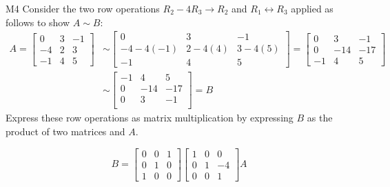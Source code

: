 \begin{problem}{M4}
Consider the two row operations 
\(R_2-4R_3\to R_2\) and \(R_1\leftrightarrow R_3\)
applied as follows to show \(A\sim B\):
\begin{align*}
A
  =
\begin{bmatrix}
0&3&-1\\
-4&2&3\\
-1&4&5
\end{bmatrix}
  &\sim
\begin{bmatrix}
0&3&-1\\
-4-4(-1)&2-4(4)&3-4(5)\\
-1&4&5
\end{bmatrix}
  =
\begin{bmatrix}
0&3&-1\\
0&-14&-17\\
-1&4&5
\end{bmatrix}
  \\&\sim
\begin{bmatrix}
-1&4&5\\
0&-14&-17\\
0&3&-1\\
\end{bmatrix}
  = 
B
\end{align*}
Express these row operations as matrix multiplication
by expressing \(B\) as the product of two matrices and \(A\).
\end{problem}
\begin{solution}
\[
B
  =
\begin{bmatrix}
  0&0&1\\
  0&1&0\\
  1&0&0
\end{bmatrix}
\begin{bmatrix}
  1&0&0\\
  0&1&-4\\
  0&0&1
\end{bmatrix}
A
\]
\end{solution}
